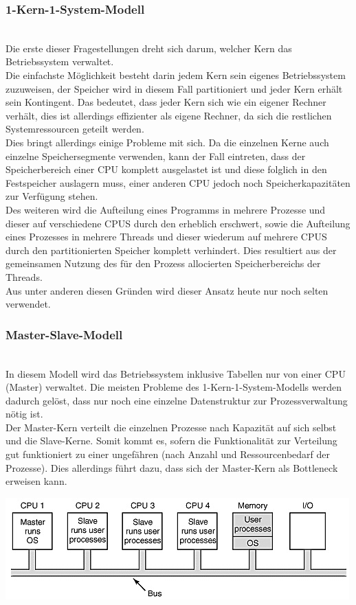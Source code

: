 \subsubsection{1-Kern-1-System-Modell} \quad \\
Die erste dieser Fragestellungen dreht sich darum, welcher Kern das Betriebssystem verwaltet. \\
Die einfachste Möglichkeit besteht darin jedem Kern sein eigenes Betriebssystem zuzuweisen, der Speicher 
wird in diesem Fall partitioniert und jeder Kern erhält sein Kontingent. Das bedeutet, dass jeder Kern sich 
wie ein eigener Rechner verhält, dies ist allerdings effizienter als eigene Rechner, da sich die restlichen 
Systemressourcen geteilt werden. \cite{tanenb2009} \\
Dies bringt allerdings einige Probleme mit sich. Da die einzelnen Kerne auch einzelne Speichersegmente verwenden, kann der Fall eintreten, dass der Speicherbereich einer CPU komplett ausgelastet ist und diese folglich in den Festspeicher auslagern muss, einer anderen CPU jedoch noch Speicherkapazitäten zur Verfügung stehen. \\
Des weiteren wird die Aufteilung eines Programms in mehrere Prozesse und dieser auf verschiedene CPUS durch den erheblich erschwert, sowie die Aufteilung eines Prozesses in mehrere Threads und dieser wiederum auf mehrere CPUS durch den partitionierten Speicher komplett verhindert. Dies resultiert aus der gemeinsamen Nutzung des für den Prozess allocierten Speicherbereichs der Threads. \\
Aus unter anderen diesen Gründen wird dieser Ansatz heute nur noch selten verwendet.

\subsubsection{Master-Slave-Modell} \quad \\
In diesem Modell wird das Betriebssystem inklusive Tabellen nur von einer CPU (Master) verwaltet. Die 
meisten Probleme des 1-Kern-1-System-Modells werden dadurch gelöst, dass nur noch eine einzelne 
Datenstruktur zur Prozessverwaltung nötig ist. \\
Der Master-Kern verteilt die einzelnen Prozesse nach Kapazität auf sich selbst und die Slave-Kerne. Somit 
kommt es, sofern die Funktionalität zur Verteilung gut funktioniert zu einer ungefähren (nach Anzahl und 
Ressourcenbedarf der Prozesse). Dies allerdings führt dazu, dass sich der Master-Kern als Bottleneck 
erweisen kann. \\
\begin{center}
	\includegraphics[scale=0.75]{Nachname/pics/assym} \cite{sureshPic}
\end{center}


